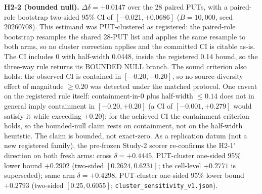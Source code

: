 \documentclass[manuscript,screen,review]{acmart}
\begin{document}
\textbf{H2-2 (bounded null).} \(\Delta\delta = +0.0147\) over the 28 paired
PUTs, with a paired-role bootstrap two-sided 95\% CI of \([-0.021, +0.0686]\)
(\(B = 10{,}000\), seed 20260708). This estimand was PUT-clustered as
registered: the paired-role bootstrap resamples the shared 28-PUT list and
applies the same resample to both arms, so no cluster correction applies and
the committed CI is citable as-is. The CI includes 0 with half-width 0.0448,
inside the registered 0.14 bound, so the three-way rule returns its BOUNDED
NULL branch. The sound criterion also holds: the observed CI is contained in
\([-0.20, +0.20]\), so no source-diversity effect of magnitude \(\geq 0.20\)
was detected under the matched protocol. One caveat on the registered rule
itself: containment-in-0 plus half-width \(\leq 0.14\) does not in general
imply containment in \([-0.20, +0.20]\) (a CI of \([-0.001, +0.279]\) would
satisfy it while exceeding \(+0.20\)); for the achieved CI the containment
criterion holds, so the bounded-null claim rests on containment, not on the
half-width heuristic. The claim is bounded, not exact-zero.
As a replication datum (not a new registered family), the pre-frozen Study-2
scorer re-confirms the H2-1\('\) direction on both fresh arms: cross
\(\delta = +0.4445\), PUT-cluster one-sided 95\% lower bound \(+0.2902\)
(two-sided \([0.2624, 0.6231]\); the cell-level \(+0.2771\) is superseded);
same arm \(\delta = +0.4298\), PUT-cluster one-sided 95\% lower bound
\(+0.2793\) (two-sided \([0.25, 0.6055]\);
\texttt{cluster\_sensitivity\_v1.json}).
\end{document}
